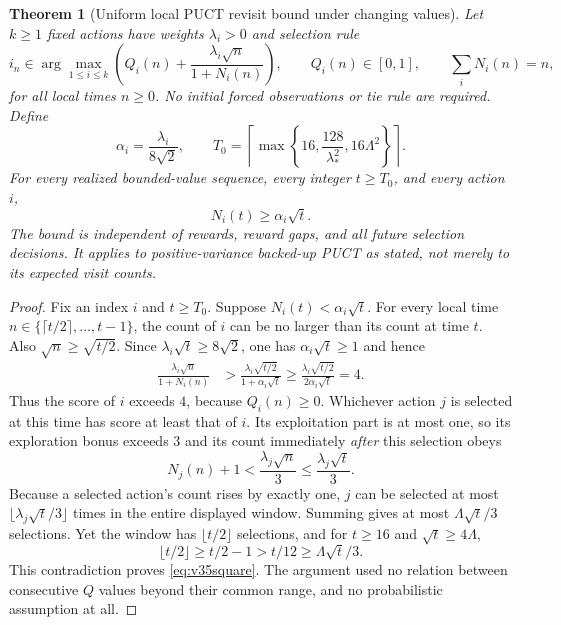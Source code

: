\documentclass{article}
\theoremstyle{plain}
\newtheorem{theorem}{Theorem}[section]
\theoremstyle{definition}
\begin{document}
\begin{theorem}[Uniform local PUCT revisit bound under changing values]
\label{thm:v35local}
Let $k\ge1$ fixed actions have weights $\lambda_i>0$ and selection rule
\begin{equation}
 i_n\in\arg\max_{1\le i\le k}
 \left(Q_i(n)+\frac{\lambda_i\sqrt n}{1+N_i(n)}\right),
 \qquad Q_i(n)\in[0,1],\qquad \sum_iN_i(n)=n,
 \label{eq:v35onevertex}
\end{equation}
for all local times $n\ge0$. No initial forced observations or tie rule are
required. Define
\begin{equation}
 \alpha_i=\frac{\lambda_i}{8\sqrt2},\qquad
 T_0=\left\lceil\max\left\{16,\frac{128}{\lambda_*^2},
 16\Lambda^2\right\}\right\rceil.
 \label{eq:v35threshold}
\end{equation}
For \emph{every} realized bounded-value sequence, every integer $t\ge T_0$,
and every action $i$,
\begin{equation}
 \boxed{\qquad N_i(t)\ge\alpha_i\sqrt t.\qquad}
 \label{eq:v35square}
\end{equation}
The bound is independent of rewards, reward gaps, and all future
selection decisions. It applies to positive-variance backed-up PUCT as stated,
not merely to its expected visit counts.
\end{theorem}
\begin{proof}
Fix an index $i$ and $t\ge T_0$. Suppose
$N_i(t)<\alpha_i\sqrt t$. For every local time
$n\in\{\lceil t/2\rceil,\ldots,t-1\}$, the count of $i$ can be no
larger than its count at time $t$. Also $\sqrt n\ge\sqrt{t/2}$.
Since $\lambda_i\sqrt t\ge8\sqrt2$, one has
$\alpha_i\sqrt t\ge1$ and hence
\begin{align*}
 \frac{\lambda_i\sqrt n}{1+N_i(n)}
 &>\frac{\lambda_i\sqrt{t/2}}{1+\alpha_i\sqrt t}
 \ge\frac{\lambda_i\sqrt{t/2}}{2\alpha_i\sqrt t}=4.
\end{align*}
Thus the score of $i$ exceeds $4$, because $Q_i(n)\ge0$.
Whichever action $j$ is selected at this time has score at least that
of $i$. Its exploitation part is at most one, so its exploration bonus
exceeds $3$ and its count immediately \emph{after} this selection obeys
\[
 N_j(n)+1<\frac{\lambda_j\sqrt n}{3}
 \le\frac{\lambda_j\sqrt t}{3}.
\]
Because a selected action's count rises by exactly one, $j$ can be
selected at most $\lfloor\lambda_j\sqrt t/3\rfloor$ times in the
entire displayed window. Summing gives at most
$\Lambda\sqrt t/3$ selections. Yet the window has
$\lfloor t/2\rfloor$ selections, and for $t\ge16$ and
$\sqrt t\ge4\Lambda$,
\[
 \lfloor t/2\rfloor\ge t/2-1>t/12
 \ge\Lambda\sqrt t/3.
\]
This contradiction proves \eqref{eq:v35square}. The argument used no
relation between consecutive $Q$ values beyond their common range,
and no probabilistic assumption at all.
\end{proof}
\end{document}
